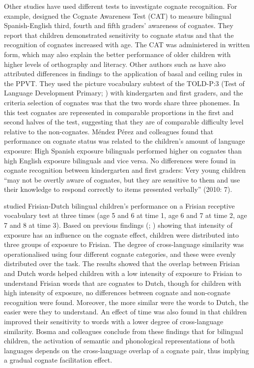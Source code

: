 \documentclass[output=paper,modfonts,nonflat,newtxmath]{langsci/langscibook}
\begin{document}
Other studies have used different tests to investigate cognate recognition. For example, \citet{MalabongaEtAl2008} designed the Cognate Awareness Test (CAT) to measure bilingual Spanish-English third, fourth and fifth graders’ awareness of cognates. They report that children demonstrated sensitivity to cognate status and that the recognition of cognates increased with age. The CAT was administered in written form, which may also explain the better performance of older children with higher levels of orthography and literacy. Other authors such as \citet{MendezPerezEtAl2010} have also attributed differences in findings to the application of basal and ceiling rules in the PPVT. They used the picture vocabulary subtest of the TOLD-P:3 (Test of Language Development Primary; \citealt{NewcomerHammill1997}) with kindergarten and first graders, and the criteria selection of cognates was that the two words share three phonemes. In this test cognates are represented in comparable proportions in the first and second halves of the test, suggesting that they are of comparable difficulty level relative to the non-cognates. Méndez Pérez and colleagues found that performance on cognate status was related to the children’s amount of language exposure: High Spanish exposure bilinguals performed higher on cognates than high English exposure bilinguals and vice versa. No differences were found in cognate recognition between kindergarten and first graders: Very young children “may not be overtly aware of cognates, but they are sensitive to them and use their knowledge to respond correctly to items presented verbally” (2010: 7).

\citet{BosmaEtAl2019} studied Frisian-Dutch bilingual children’s performance on a Frisian receptive vocabulary test at three times (age 5 and 6 at time 1, age 6 and 7 at time 2, age 7 and 8 at time 3). Based on previous findings (\citealt{MendezPerezEtAl2010}; \citealt{Dijkstra2013}) showing that intensity of exposure has an influence on the cognate effect, children were distributed into three groups of exposure to Frisian. The degree of cross-language similarity was operationalised using four different cognate categories, and these were evenly distributed over the task. The results showed that the overlap between Frisian and Dutch words helped children with a low intensity of exposure to Frisian to understand Frisian words that are cognates to Dutch, though for children with high intensity of exposure, no differences between cognate and non-cognate recognition were found. Moreover, the more similar were the words to Dutch, the easier were they to understand. An effect of time was also found in that children improved their sensitivity to words with a lower degree of cross-language similarity. Bosma and colleagues conclude from these findings that for bilingual children, the activation of semantic and phonological representations of both languages depends on the cross-language overlap of a cognate pair, thus implying a gradual cognate facilitation effect.
\end{document}
